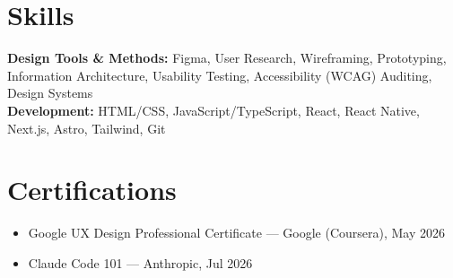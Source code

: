 \documentclass[11pt,letterpaper]{article}
\begin{document}
\section*{Skills}
{\raggedright
\textbf{Design Tools \& Methods:} Figma, User Research, Wireframing, Prototyping, Information Architecture, Usability Testing, Accessibility (WCAG) Auditing, Design Systems \\
\textbf{Development:} HTML/CSS, JavaScript/TypeScript, React, React Native, Next.js, Astro, Tailwind, Git\par}

\section*{Certifications}
\begin{itemize}
	\item Google UX Design Professional Certificate --- Google (Coursera), May 2026
	\item Claude Code 101 --- Anthropic, Jul 2026
\end{itemize}
\end{document}
